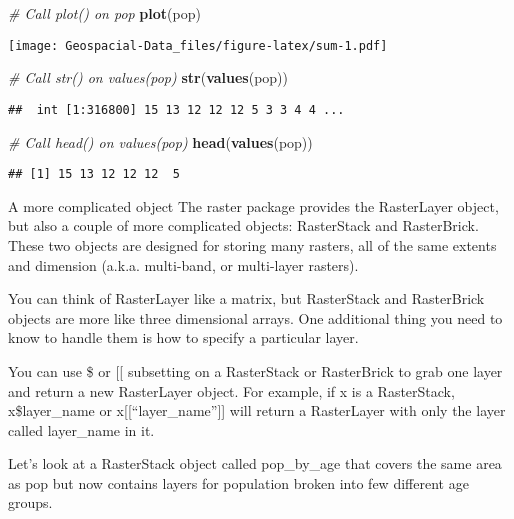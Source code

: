 \documentclass[]{article}
\newenvironment{Shaded}{\begin{snugshade}}{\end{snugshade}}
\newcommand{\CommentTok}[1]{\textcolor[rgb]{0.56,0.35,0.01}{\textit{#1}}}
\newcommand{\KeywordTok}[1]{\textcolor[rgb]{0.13,0.29,0.53}{\textbf{#1}}}
\newcommand{\NormalTok}[1]{#1}
\begin{document}
\begin{Shaded}
\begin{Highlighting}[]
\CommentTok{# Call plot() on pop}
\KeywordTok{plot}\NormalTok{(pop)}
\end{Highlighting}
\end{Shaded}

\texttt{[image: Geospacial-Data\_files/figure-latex/sum-1.pdf]}

\begin{Shaded}
\begin{Highlighting}[]
\CommentTok{# Call str() on values(pop)}
\KeywordTok{str}\NormalTok{(}\KeywordTok{values}\NormalTok{(pop))}
\end{Highlighting}
\end{Shaded}

\begin{verbatim}
##  int [1:316800] 15 13 12 12 12 5 3 3 4 4 ...
\end{verbatim}

\begin{Shaded}
\begin{Highlighting}[]
\CommentTok{# Call head() on values(pop)}
\KeywordTok{head}\NormalTok{(}\KeywordTok{values}\NormalTok{(pop))}
\end{Highlighting}
\end{Shaded}

\begin{verbatim}
## [1] 15 13 12 12 12  5
\end{verbatim}

A more complicated object The raster package provides the RasterLayer
object, but also a couple of more complicated objects: RasterStack and
RasterBrick. These two objects are designed for storing many rasters,
all of the same extents and dimension (a.k.a. multi-band, or multi-layer
rasters).

You can think of RasterLayer like a matrix, but RasterStack and
RasterBrick objects are more like three dimensional arrays. One
additional thing you need to know to handle them is how to specify a
particular layer.

You can use \$ or {[}{[} subsetting on a RasterStack or RasterBrick to
grab one layer and return a new RasterLayer object. For example, if x is
a RasterStack, x\$layer\_name or x{[}{[}``layer\_name''{]}{]} will
return a RasterLayer with only the layer called layer\_name in it.

Let's look at a RasterStack object called pop\_by\_age that covers the
same area as pop but now contains layers for population broken into few
different age groups.
\end{document}
